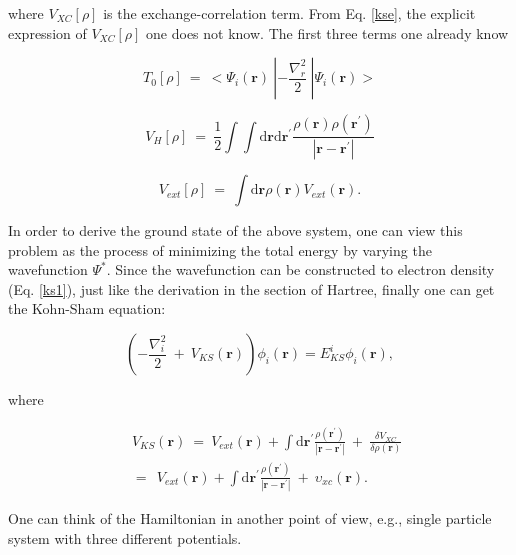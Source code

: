 \documentclass[a4paper, 12pt, titlepage,oneside,drop]{kthesis}
\begin{document}
where $V_\textit{XC}[\rho]$  is the exchange-correlation term. From Eq. \ref{kse}, the explicit expression of $V_\textit{XC}[\rho]$ one does not know. 
The first three terms one already know

\begin{equation}
 T_{0}[\rho]\ = \ < \Psi_{i}(\textbf{r}) \ | -\frac{\nabla^{2}_{r}}{2} \ | \Psi_{i}(\textbf{r}) >
\end{equation}

\begin{equation}
V_\textit{H}[\rho] \ = \ \frac{1}{2} \int \int \mathrm{d} {\textbf{r}} \mathrm{d}{\textbf{r}^{\prime}} \frac{\rho({\textbf{r}})\rho(\textbf{r}^{\prime})}{|{\textbf{r}}-{\textbf{r}}^{\prime}|}
\end{equation}

\begin{equation}
V_\textit{ext}[\rho]\ = \ \int \mathrm{d}{\textbf{r}} \rho(\textbf{r}) V_\textit{ext}(\textbf{r}). 
\end{equation}

In order to derive the ground state of the above system, one can view this problem as the process of minimizing the total energy by varying the wavefunction $\Psi^*$. Since
 the wavefunction can be constructed to electron density (Eq. \ref{ks1}), just like the derivation in the section of Hartree, finally one can get the Kohn-Sham equation:

\begin{equation}\label{aaa}
 (-\frac{\nabla^{2}_{i}}{2}\ + \ V_\textit{KS}(\textbf{r})) \phi_{\textit{i}}(\textbf{r}) = E_{\textit{KS}}^{\textit{i}} \phi_{\textit{i}}(\textbf{r}),
\end{equation}

where

\begin{equation}\begin{split}
&\ V_\textit{KS}(\textbf{r}) \ = \ V_\textit{ext}(\textbf{r}) + \int \mathrm{d}{\textbf{r}^{\prime}}  \frac{\rho(\textbf{r}^{\prime})}{|{\textbf{r}}-{\textbf{r}}^{\prime}|} \ + \ \frac{\delta{V_\textit{XC}}}{\delta{\rho(\textbf{r})}} \\
&\ = \ \ V_\textit{ext}(\textbf{r}) + \int \mathrm{d}{\textbf{r}^{\prime}}  \frac{\rho(\textbf{r}^{\prime})}{|{\textbf{r}}-{\textbf{r}}^{\prime}|} \ + \ \upsilon_\textit{xc}(\textbf{r}).
\end{split}
\end{equation}

One can think of the Hamiltonian in another point of view, e.g., single particle system with three different potentials. 
\end{document}
